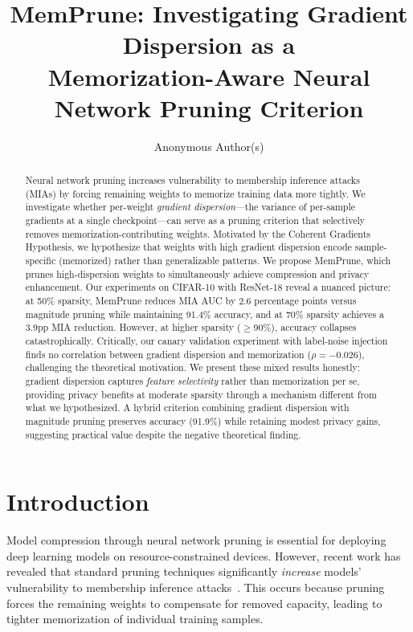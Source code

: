 \documentclass{article}
\title{MemPrune: Investigating Gradient Dispersion as a \\ Memorization-Aware Neural Network Pruning Criterion}
\author{
  Anonymous Author(s)
}
\begin{document}
\maketitle

\begin{abstract}
Neural network pruning increases vulnerability to membership inference attacks (MIAs) by forcing remaining weights to memorize training data more tightly. We investigate whether per-weight \emph{gradient dispersion}---the variance of per-sample gradients at a single checkpoint---can serve as a pruning criterion that selectively removes memorization-contributing weights. Motivated by the Coherent Gradients Hypothesis, we hypothesize that weights with high gradient dispersion encode sample-specific (memorized) rather than generalizable patterns. We propose MemPrune, which prunes high-dispersion weights to simultaneously achieve compression and privacy enhancement. Our experiments on CIFAR-10 with ResNet-18 reveal a nuanced picture: at 50\% sparsity, MemPrune reduces MIA AUC by 2.6 percentage points versus magnitude pruning while maintaining 91.4\% accuracy, and at 70\% sparsity achieves a 3.9pp MIA reduction. However, at higher sparsity ($\geq$90\%), accuracy collapses catastrophically. Critically, our canary validation experiment with label-noise injection finds no correlation between gradient dispersion and memorization ($\rho = -0.026$), challenging the theoretical motivation. We present these mixed results honestly: gradient dispersion captures \emph{feature selectivity} rather than memorization per se, providing privacy benefits at moderate sparsity through a mechanism different from what we hypothesized. A hybrid criterion combining gradient dispersion with magnitude pruning preserves accuracy (91.9\%) while retaining modest privacy gains, suggesting practical value despite the negative theoretical finding.
\end{abstract}

\section{Introduction}

Model compression through neural network pruning is essential for deploying deep learning models on resource-constrained devices. However, recent work has revealed that standard pruning techniques significantly \emph{increase} models' vulnerability to membership inference attacks~\citep{yuan2022membership, shang2025wemem}. This occurs because pruning forces the remaining weights to compensate for removed capacity, leading to tighter memorization of individual training samples.
\end{document}
